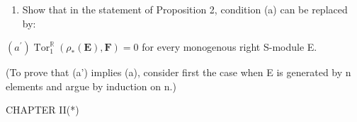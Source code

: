 
\begin{enumerate}
\def\labelenumi{\arabic{enumi}.}
\tightlist
\item
  Show that in the statement of Proposition 2, condition (a) can be replaced by:
\end{enumerate}

\((a^{\prime})\operatorname{Tor}_{1}^{\mathbb{R}}(\rho_{*}(\mathbf{E}),\mathbf{F}) = 0\) for every monogenous right S-module E.

(To prove that (a') implies (a), consider first the case when E is generated by n elements and argue by induction on n.)

CHAPTER II(*)

